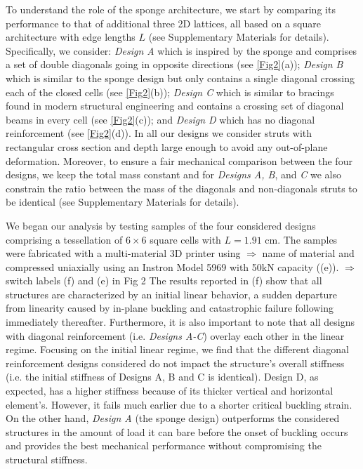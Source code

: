 \documentclass[9pt,twocolumn,twoside]{fernandes_paper}
\newcommand{\KB}[1]{\noindent\color{blue}$\Longrightarrow$ #1\normalcolor}
\newcommand{\mf}[1]{\noindent\color{orange}{$\Longrightarrow$#1}\normalcolor}
\begin{document}
To understand the role of the sponge architecture, we start by comparing its performance to that of additional three 2D lattices, all based on a square architecture with edge lengths $L$ (see Supplementary Materials for details). Specifically,  we  consider:
\emph{Design A}  which is inspired by the sponge and comprises a set of double diagonals going in opposite directions (see \cref{Fig2}(a)); \emph{Design B}  which is similar to the sponge design but only contains a single diagonal crossing each of the closed cells (see \cref{Fig2}(b));   \emph{Design C} which is similar to bracings found in modern structural engineering and contains a crossing set of diagonal beams in every cell (see \cref{Fig2}(c)); and \emph{Design D}  which  has no diagonal reinforcement (see \cref{Fig2}(d)). In all our designs we consider struts with rectangular cross section and depth large enough to avoid any out-of-plane deformation. Moreover, to ensure a fair mechanical comparison between the four designs, we keep the total mass constant and
for \emph{Designs A, B}, and \emph{C} we also constrain the  ratio between the mass of the diagonals and non-diagonals struts to be identical (see Supplementary Materials for details).  %

We began our analysis by testing samples of the four considered designs comprising a tessellation of $6\times6$ square cells with $L=1.91$ cm. The samples were fabricated with a multi-material 3D printer \mf{(add model @James)} using \KB{name of material} \mf{add info here @James} and compressed uniaxially  using  an Instron Model 5969 with 50kN capacity  ((e)). \KB{switch labels (f) and (e) in Fig 2} %
The results reported in (f)  show that all structures are characterized by an initial linear behavior, a sudden departure from linearity caused by in-plane buckling and catastrophic failure following immediately thereafter.   Furthermore, it is also important to note that all  designs with diagonal reinforcement (i.e. \emph{Designs A-C}) overlay each other in the linear regime. Focusing on the initial linear regime, we find that  the different diagonal reinforcement designs considered do not impact the structure's overall stiffness (i.e. the initial stiffness of Designs A, B and C is identical). Design D, as expected, has a higher stiffness because of its thicker vertical and horizontal element's. However, it fails much earlier due to a shorter critical buckling strain. On the other hand, \emph{Design A} (the sponge design) outperforms the  considered structures in the amount of load it can bare before the onset of buckling occurs and provides the best mechanical performance without compromising the structural stiffness.
\end{document}

